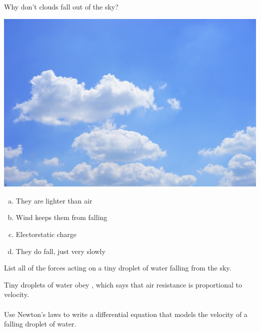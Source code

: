 
\begin{applicationActivities}




\begin{activity}{5}
Why don't clouds fall out of the sky?
\begin{center}
\includegraphics[scale=0.2]{media/cloud.jpg}
\end{center}

\begin{enumerate}[(a)]
\item They are lighter than air
\item Wind keeps them from falling
\item Electorstatic charge
\item They do fall, just very slowly
\end{enumerate}
\end{activity}

\begin{activity}{5}
List all of the forces acting on a tiny droplet of water falling from the sky.
\end{activity}

\begin{activity}{5}
Tiny droplets of water obey , which says that air resistance is proportional to velocity.
\\~\\
Use Newton's laws to write a differential equation that models the velocity of a falling droplet of water.  
\end{activity}



\end{applicationActivities}
